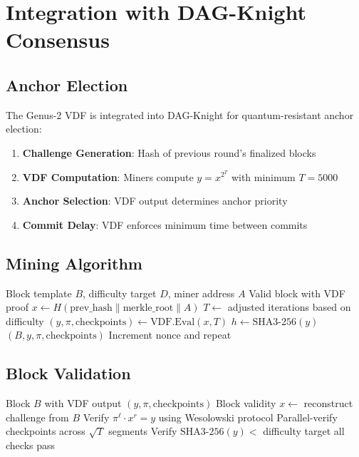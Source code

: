 \documentclass[11pt,a4paper]{article}
\begin{document}
\section{Integration with DAG-Knight Consensus}

\subsection{Anchor Election}

The Genus-2 VDF is integrated into DAG-Knight for quantum-resistant anchor election:

\begin{enumerate}
    \item \textbf{Challenge Generation}: Hash of previous round's finalized blocks
    \item \textbf{VDF Computation}: Miners compute $y = x^{2^T}$ with minimum $T = 5000$
    \item \textbf{Anchor Selection}: VDF output determines anchor priority
    \item \textbf{Commit Delay}: VDF enforces minimum time between commits
\end{enumerate}

\subsection{Mining Algorithm}

\begin{algorithm}
\caption{Genus-2 VDF Mining}
\begin{algorithmic}[1]
\Require Block template $B$, difficulty target $D$, miner address $A$
\Ensure Valid block with VDF proof
\State $x \gets H(\text{prev\_hash} \| \text{merkle\_root} \| A)$ 
\State $T \gets$ adjusted iterations based on difficulty
\State $(y, \pi, \text{checkpoints}) \gets \text{VDF.Eval}(x, T)$
\State $h \gets \text{SHA3-256}(y)$
    \State \Return $(B, y, \pi, \text{checkpoints})$ 
\EndIf
\State Increment nonce and repeat
\end{algorithmic}
\end{algorithm}

\subsection{Block Validation}

\begin{algorithm}
\caption{Block Verification}
\begin{algorithmic}[1]
\Require Block $B$ with VDF output $(y, \pi, \text{checkpoints})$
\Ensure Block validity
\State $x \gets$ reconstruct challenge from $B$
\State Verify $\pi^\ell \cdot x^r = y$ using Wesolowski protocol
\State Parallel-verify checkpoints across $\sqrt{T}$ segments
\State Verify $\text{SHA3-256}(y) <$ difficulty target
\State \Return all checks pass
\end{algorithmic}
\end{algorithm}
\end{document}
